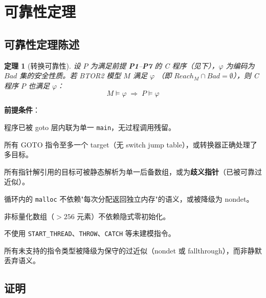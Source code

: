 \documentclass[11pt,a4paper]{article}
\newtheorem{theorem}{定理}[section]
\newcommand{\Reach}{\mathit{Reach}}
\newcommand{\Bad}{\mathit{Bad}}
\begin{document}
\section{可靠性定理}
\label{sec:soundness}

\subsection{可靠性定理陈述}

\begin{theorem}[转换可靠性]
  \label{thm:sound}
  设 $P$ 为满足前提 \textbf{P1}--\textbf{P7} 的 C 程序（见下），$\varphi$
  为编码为 $\Bad$ 集的安全性质。若 BTOR2 模型 $M$ 满足 $\varphi$
  （即 $\Reach_M \cap \Bad = \emptyset$），则 C 程序 $P$ 也满足 $\varphi$：
  \[
    M \models \varphi \;\Longrightarrow\; P \models \varphi
  \]
\end{theorem}

\textbf{前提条件}：
\begin{description}[font=\bfseries,labelwidth=2em]
  \item[P1] 程序已被 goto 层内联为单一 \texttt{main}，无过程调用残留。
  \item[P2] 所有 GOTO 指令至多一个 target（无 switch jump table），或转换器正确处理了多目标。
  \item[P3] 所有指针解引用的目标可被静态解析为单一后备数组，或为\textbf{歧义指针}（已被可靠过近似）。
  \item[P4] 循环内的 \texttt{malloc} 不依赖"每次分配返回独立内存"的语义，或被降级为 nondet。
  \item[P5] 非标量化数组（$>256$ 元素）不依赖隐式零初始化。
  \item[P6] 不使用 \texttt{START\_THREAD}、\texttt{THROW}、\texttt{CATCH} 等未建模指令。
  \item[P7] 所有未支持的指令类型被降级为保守的过近似（nondet 或 fallthrough），而非静默丢弃语义。
\end{description}

\subsection{证明}
\end{document}

